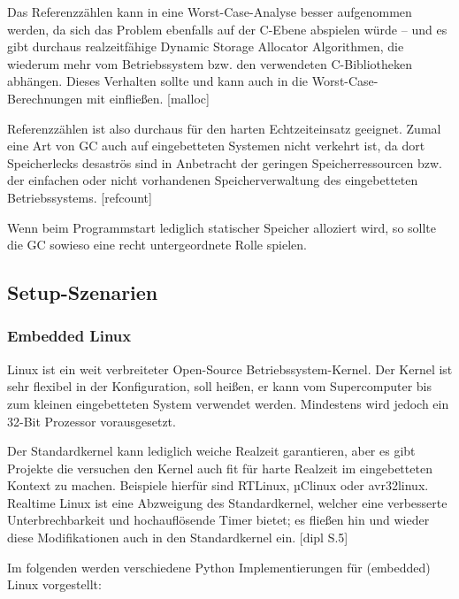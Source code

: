 Das Referenzzählen kann in eine Worst-Case-Analyse besser aufgenommen werden,
da sich das Problem ebenfalls auf der C-Ebene abspielen würde -- und es gibt
durchaus realzeitfähige Dynamic Storage Allocator Algorithmen, die wiederum
mehr vom Betriebssystem bzw. den verwendeten C-Bibliotheken abhängen. Dieses
Verhalten sollte und kann auch in die Worst-Case-Berechnungen mit einfließen. [malloc]

Referenzzählen ist also durchaus für den harten Echtzeiteinsatz geeignet.
Zumal eine Art von GC auch auf eingebetteten Systemen nicht verkehrt ist, da
dort Speicherlecks desaströs sind in Anbetracht der geringen
Speicherressourcen bzw. der einfachen oder nicht vorhandenen
Speicherverwaltung des eingebetteten Betriebssystems. [refcount]

Wenn beim Programmstart lediglich statischer Speicher alloziert wird, so
sollte die GC sowieso eine recht untergeordnete Rolle spielen.


\subsection{Setup-Szenarien}


\subsubsection{Embedded Linux}


Linux ist ein weit verbreiteter Open-Source Betriebssystem-Kernel. Der Kernel
ist sehr flexibel in der Konfiguration, soll heißen, er kann vom Supercomputer
bis zum kleinen eingebetteten System verwendet werden. Mindestens wird jedoch
ein 32-Bit Prozessor vorausgesetzt.

Der Standardkernel kann lediglich weiche Realzeit garantieren, aber es gibt
Projekte die versuchen den Kernel auch fit für harte Realzeit im eingebetteten
Kontext zu machen. Beispiele hierfür sind RTLinux, µClinux oder avr32linux.
Realtime Linux ist eine Abzweigung des Standardkernel, welcher eine
verbesserte Unterbrechbarkeit und hochauflösende Timer bietet; es fließen hin
und wieder diese Modifikationen auch in den Standardkernel ein. [dipl S.5]

Im folgenden werden verschiedene Python Implementierungen für (embedded) Linux
vorgestellt:


